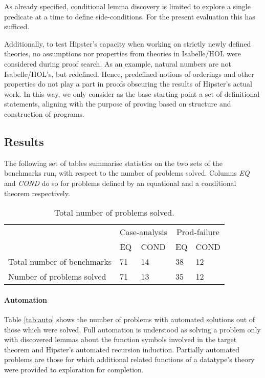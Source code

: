 As already specified, conditional lemma discovery is limited to explore a single predicate at a time to define side-conditions.
%
For the present evaluation this has sufficed.

Additionally, to test Hipster's capacity when working on strictly newly defined theories, no assumptions nor properties from theories in Isabelle/HOL were considered during proof search.
%
As an example, natural numbers are not Isabelle/HOL's, but redefined.
%
Hence, predefined notions of orderings and other properties do not play a part in proofs obscuring the results of Hipster's actual work.
%
In this way, we only consider as the base starting point a set of definitional statements, aligning with the purpose of proving based on structure and construction of programs.


\subsection{Results}

The following set of tables summarise statistics on the two sets of the benchmarks run, with respect to the number of problems solved.
%
Columns \emph{EQ} and \emph{COND} do so for problems defined by an equational and a conditional theorem respectively.

\noindent \begin{table}[htbp]
\begin{tabularx}{\textwidth}{l | X X | X X}
  & \multicolumn{2}{c|}{Case-analysis} & \multicolumn{2}{c}{Prod-failure} \\
  &  EQ & COND & EQ & COND \\
  \hline
  Total number of benchmarks & 71 & 14 & 38 & 12 \\
  Number of problems solved & 71 & 13 & 35 & 12 \\
\end{tabularx}
\caption{Total number of problems solved.}
\label{tab:total}
\end{table}


\paragraph{Automation}
%
Table \ref{tab:auto} shows the number of problems with automated solutions out of those which were solved.
%
Full automation is understood as solving a problem only with discovered lemmas about the function symbols involved in the target theorem and Hipster's automated recursion induction.
%
Partially automated problems are those for which additional related functions of a datatype's theory were provided to exploration for completion.

